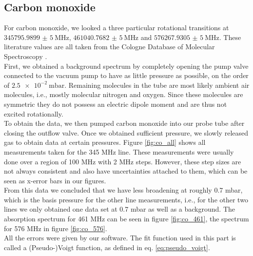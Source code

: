 \documentclass[a4paper,10pt]{scrartcl}
\begin{document}
\subsection{Carbon monoxide}

For carbon monoxide, we looked a three particular rotational transitions at $\SI{345795,9899(5)}{\mega\hertz}$, $\SI{461040,7682(5)}{\mega\hertz}$ and $\SI{576267,9305(5)}{\mega\hertz}$. These literature values are all taken from the Cologne Database of Molecular Spectroscopy \cite{cdms}.\\
First, we obtained a background spectrum by completely opening the pump valve connected to the vacuum pump to have as little pressure as possible, on the order of $\SI{2,5e-2}{\milli\bar}$. Remaining molecules in the tube are most likely ambient air molecules, i.e., mostly molecular nitrogen and oxygen. Since these molecules are symmetric they do not possess an electric dipole moment and are thus not excited rotationally.\\
To obtain the data, we then pumped carbon monoxide into our probe tube after closing the outflow valve. Once we obtained sufficient pressure, we slowly released gas to obtain data at certain pressures. Figure \ref{fig:co_all} shows all measurements taken for the 345 MHz line. These measurements were usually done over a region of 100 MHz with 2 MHz steps. However, these step sizes are not always consistent and also have uncertainties attached to them, which can be seen as x-error bars in our figures.\\
From this data we concluded that we have less broadening at roughly 0.7 mbar, which is the basis pressure for the other line measurements, i.e., for the other two lines we only obtained one data set at 0.7 mbar as well as a background. The absorption spectrum for 461 MHz can be seen in figure \ref{fig:co_461}, the spectrum for 576 MHz in figure \ref{fig:co_576}.\\
All the errors were given by our software. The fit function used in this part is called a (Pseudo-)Voigt function, as defined in eq. \eqref{eq:pseudo_voigt}. 
\end{document}
